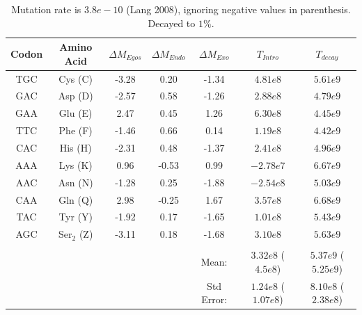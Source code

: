 \documentclass[12pt]{article}
\begin{document}
\begin{table}
\centering
\begin{tabular}{ | c | c | c | c | c | c | c | }
\hline
	Codon & Amino Acid & $\Delta M_{Egos}$ & $\Delta M_{Endo}$ & $\Delta M_{Exo}$ &$T_{Intro}$ & $T_{decay}$ \\ \hline
	TGC & Cys (C) & -3.28 & 0.20 & -1.34 & $4.81e8$ & $5.61e9$ \\ \hline
	GAC & Asp (D) & -2.57 & 0.58 & -1.26  & $2.88e8$ & $4.79e9$ \\ \hline
	GAA & Glu (E) & 2.47 & 0.45 & 1.26 & $6.30e8$ & $4.45e9$ \\ \hline
	TTC & Phe (F) & -1.46 & 0.66 & 0.14  & $1.19e8$ & $4.42e9$ \\ \hline
	CAC & His (H) & -2.31 & 0.48 & -1.37  & $2.41e8$ & $4.96e9$ \\ \hline
	AAA & Lys (K) & 0.96 & -0.53 & 0.99 & $-2.78e7$ & $6.67e9$ \\ \hline
	AAC & Asn (N) & -1.28 & 0.25 & -1.88 & $-2.54e8$ & $5.03e9$ \\ \hline
	CAA & Gln (Q) & 2.98 & -0.25 & 1.67 & $3.57e8$ & $6.68e9$ \\ \hline
	TAC & Tyr (Y) & -1.92 & 0.17 & -1.65 & $1.01e8$ & $5.43e9$ \\ \hline
	AGC & Ser$_2 $ (Z) & -3.11 & 0.18 & -1.68 & $3.10e8$ & $5.63e9$ \\ \hline
	& & & & & &   \\ \hline
	& & & & Mean: & $3.32e8$ ($4.5e8$) & $5.37e9$ ($5.25e9$) \\ \hline
	& & & & Std Error: & $1.24e8$ ($1.07e8$) & $8.10e8$ ($2.38e8$)\\ \hline
\end{tabular}
\caption{Mutation rate is $3.8e-10$ (Lang 2008), ignoring negative values in parenthesis. Decayed to $1 \%$. }
\label{tab:intro_age}
\end{table}
\end{document}
